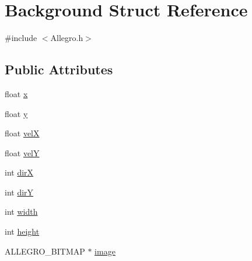 \hypertarget{structBackground}{
\section{Background Struct Reference}
\label{structBackground}
}


{\ttfamily \#include $<$Allegro.h$>$}\subsection*{Public Attributes}
\begin{DoxyCompactItemize}
\item 
float \hyperlink{structBackground_af6650023418d2982420370f87eeff2de}{x}
\item 
float \hyperlink{structBackground_adb462ce7dc04d3b09698f1baa3d173e6}{y}
\item 
float \hyperlink{structBackground_a3baf341baf83315a91f694bafebf3a0e}{velX}
\item 
float \hyperlink{structBackground_a012729329c3eaaf671374116d9336fba}{velY}
\item 
int \hyperlink{structBackground_afee83ed66ba7a564613525287cc33b32}{dirX}
\item 
int \hyperlink{structBackground_ae85e5871207ab04a678f217b3baf72fc}{dirY}
\item 
int \hyperlink{structBackground_a43297fc8fceec13bed4e292a45bf564d}{width}
\item 
int \hyperlink{structBackground_ab309ccac36fbe6b88cab0e30e8da1452}{height}
\item 
ALLEGRO\_\-BITMAP $\ast$ \hyperlink{structBackground_aca1e48275f069718251c7023ddb5c9bb}{image}
\end{DoxyCompactItemize}


